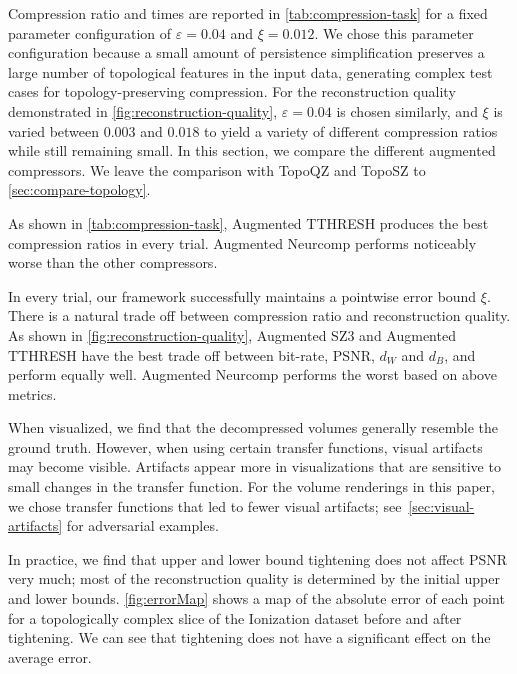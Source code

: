 Compression ratio and times are reported in \cref{tab:compression-task} for a fixed parameter configuration of $\varepsilon = 0.04$ and $\xi = 0.012$.
We chose this parameter configuration because a small amount of persistence simplification preserves a large number of topological features in the input data, generating complex test cases for topology-preserving compression. For the reconstruction quality demonstrated in \cref{fig:reconstruction-quality}, $\varepsilon = 0.04$ is chosen similarly, and $\xi$ is varied between $0.003$ and $0.018$ to yield a variety of different compression ratios while still remaining small.
In this section, we compare the different augmented compressors. We leave the comparison with TopoQZ and TopoSZ to \cref{sec:compare-topology}.

As shown in \cref{tab:compression-task}, Augmented TTHRESH produces the best compression ratios in every trial. Augmented Neurcomp performs noticeably worse than the other compressors.

In every trial, our framework successfully maintains a pointwise error bound $\xi$. There is a natural trade off between compression ratio and reconstruction quality. As shown in \cref{fig:reconstruction-quality}, Augmented SZ3 and Augmented TTHRESH have the best trade off between bit-rate, PSNR, $d_W$ and $d_B$, and perform equally well. Augmented Neurcomp performs the worst based on above metrics.

When visualized, we find that the decompressed volumes generally resemble the ground truth. However, when using certain transfer functions, visual artifacts may become visible. Artifacts appear more in visualizations that are sensitive to small changes in the transfer function. For the volume renderings in this paper, we chose transfer functions that led to fewer visual artifacts; see~\cref{sec:visual-artifacts} for adversarial examples.

In practice, we find that upper and lower bound tightening does not affect PSNR very much; most of the reconstruction quality is determined by the initial upper and lower bounds. \cref{fig:errorMap} shows a map of the absolute error of each point for a topologically complex slice of the Ionization dataset before and after tightening. We can see that tightening does not have a significant effect on the average error.

